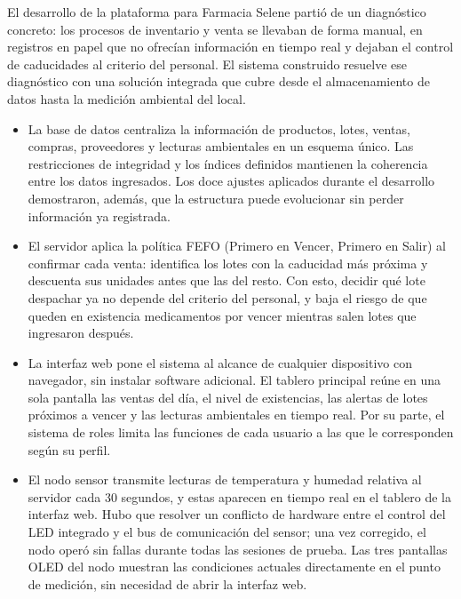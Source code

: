 
El desarrollo de la plataforma para Farmacia Selene partió de un diagnóstico concreto: los procesos de inventario y venta se llevaban de forma manual, en registros en papel que no ofrecían información en tiempo real y dejaban el control de caducidades al criterio del personal. El sistema construido resuelve ese diagnóstico con una solución integrada que cubre desde el almacenamiento de datos hasta la medición ambiental del local.

\begin{itemize}

    \item La base de datos centraliza la información de productos, lotes, ventas, compras, proveedores y lecturas ambientales en un esquema único. Las restricciones de integridad y los índices definidos mantienen la coherencia entre los datos ingresados. Los doce ajustes aplicados durante el desarrollo demostraron, además, que la estructura puede evolucionar sin perder información ya registrada.

    \item El servidor aplica la política FEFO (Primero en Vencer, Primero en Salir) al confirmar cada venta: identifica los lotes con la caducidad más próxima y descuenta sus unidades antes que las del resto. Con esto, decidir qué lote despachar ya no depende del criterio del personal, y baja el riesgo de que queden en existencia medicamentos por vencer mientras salen lotes que ingresaron después.

    \item La interfaz web pone el sistema al alcance de cualquier dispositivo con navegador, sin instalar software adicional. El tablero principal reúne en una sola pantalla las ventas del día, el nivel de existencias, las alertas de lotes próximos a vencer y las lecturas ambientales en tiempo real. Por su parte, el sistema de roles limita las funciones de cada usuario a las que le corresponden según su perfil.

    \item El nodo sensor transmite lecturas de temperatura y humedad relativa al servidor cada 30 segundos, y estas aparecen en tiempo real en el tablero de la interfaz web. Hubo que resolver un conflicto de hardware entre el control del LED integrado y el bus de comunicación del sensor; una vez corregido, el nodo operó sin fallas durante todas las sesiones de prueba. Las tres pantallas OLED del nodo muestran las condiciones actuales directamente en el punto de medición, sin necesidad de abrir la interfaz web.


\end{itemize}
